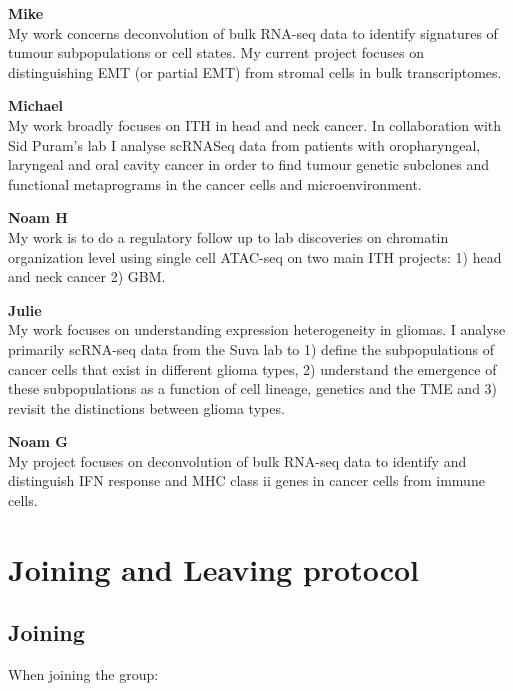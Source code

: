 \documentclass[]{book}
\begin{document}
\textbf{Mike}\\
My work concerns deconvolution of bulk RNA-seq data to identify
signatures of tumour subpopulations or cell states. My current project
focuses on distinguishing EMT (or partial EMT) from stromal cells in
bulk transcriptomes.

\textbf{Michael}\\
My work broadly focuses on ITH in head and neck cancer. In collaboration
with Sid Puram's lab I analyse scRNASeq data from patients with
oropharyngeal, laryngeal and oral cavity cancer in order to find tumour
genetic subclones and functional metaprograms in the cancer cells and
microenvironment.

\textbf{Noam H}\\
My work is to do a regulatory follow up to lab discoveries on chromatin
organization level using single cell ATAC-seq on two main ITH projects:
1) head and neck cancer 2) GBM.

\textbf{Julie}\\
My work focuses on understanding expression heterogeneity in gliomas. I
analyse primarily scRNA-seq data from the Suva lab to 1) define the
subpopulations of cancer cells that exist in different glioma types, 2)
understand the emergence of these subpopulations as a function of cell
lineage, genetics and the TME and 3) revisit the distinctions between
glioma types.

\textbf{Noam G}\\
My project focuses on deconvolution of bulk RNA-seq data to identify and
distinguish IFN response and MHC class ii genes in cancer cells from
immune cells.

\chapter{Joining and Leaving protocol}\label{joiningLeaving}

\section{Joining}\label{joining}

When joining the group:
\end{document}
